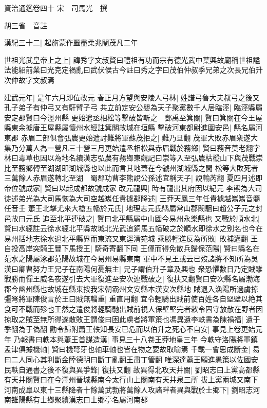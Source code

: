 資治通鑑卷四十
宋　司馬光　撰

胡三省　音註

漢紀三十二|{
	起旃蒙作噩盡柔兆閹茂凡二年}


世祖光武皇帝上之上|{
	諱秀字文叔賢曰禮祖有功而宗有德光武中葉興故廟稱世祖謚法能紹前業曰光克定禍亂曰武伏侯古今註曰秀之字曰茂伯仲叔季兄弟之次長兄伯升次仲故字文叔焉}


建武元年|{
	是年六月即位改元}
春正月方望與安陵人弓林|{
	姓譜弓魯大夫叔弓之後又孔子弟子有仲弓又有馯臂子弓}
共立前定安公嬰為天子聚黨數千人居臨涇|{
	臨涇縣屬安定郡賢曰今涇州縣}
更始遣丞相松等擊破皆斬之　鄧禹至箕關|{
	賢曰箕關在今王屋縣東余據唐王屋縣屬懷州水經註箕關故城在垣縣}
擊破河東都尉進圍安邑|{
	縣名屬河東郡}
赤眉二部俱會弘農更始遣討難將軍蘇茂拒之|{
	難乃旦翻}
茂軍大敗赤眉衆遂大集乃分萬人為一營凡三十營三月更始遣丞相松與赤眉戰於蓩鄉|{
	賢曰蓩音莫老翻字林曰毒草也因以為地名續漢志弘農有蓩鄉東觀記曰崇等入至弘農枯樅山下與茂戰崇比至蓩鄉轉至湖湖即湖城縣也以此而言其地蓋在今虢州湖城縣之間}
松等大敗死者三萬餘人赤眉遂轉北至湖　蜀郡功曹李熊說公孫述宜稱天子|{
	說輸芮翻}
夏四月述即帝位號成家|{
	賢曰以起成都故號成家}
改元龍興|{
	時有龍出其府因以紀元}
李熊為大司徒述弟光為大司馬恢為大司空越嶲任貴據郡降述|{
	王莽天鳳三年任貴據越嶲嶲音髓任音壬}
蕭王北擊尤來大槍五幡於元氏|{
	地理志元氏縣屬常山郡闞駰曰趙公子元之封邑故曰元氏}
追至北平連破之|{
	賢曰北平縣屬中山國今易州永樂縣也}
又戰於順水北|{
	賢曰水經註云徐水經北平縣故城北光武追銅馬五幡破之於順水即徐水之别名也今在易州括地志徐水過北平縣界而東流又東逕清苑城}
乘勝輕進反為所敗|{
	敗補邁翻}
王自投高岸突騎王豐下馬授王|{
	騎奇寄翻下同}
王僅而得免散兵歸保范陽|{
	賢曰縣名在范水之陽屬涿郡范陽故城在今易州易縣東南}
軍中不見王或云已歿諸將不知所為吳漢曰卿曹努力王兄子在南陽何憂無主|{
	兄子謂伯升子章及興也}
衆恐懼數日乃定賊雖戰勝而憚王威名夜遂引去大軍復進至安次連戰破之|{
	復扶又翻賢曰安次縣名屬渤海郡今幽州縣也故城在縣東按我宋朝霸州文安縣本漢安次縣地}
賊退入漁陽所過虜掠彊弩將軍陳俊言於王曰賊無輜重|{
	重直用翻}
宜令輕騎出賊前使百姓各自堅壁以絶其食可不戰而殄也王然之遣俊將輕騎馳出賊前視人保壁堅完者敕令固守放散在野者因掠取之賊至無所得遂散敗王謂俊曰困此虜者將軍策也馮異遺李軼書為陳禍福|{
	遺于季翻為于偽翻}
勸令歸附蕭王軼知長安已危而以伯升之死心不自安|{
	事見上卷更始元年}
乃報書曰軼本與蕭王首謀造漢|{
	事見三十八卷王莽地皇三年}
今軼守洛陽將軍鎮孟津俱據機軸|{
	賢曰機弩牙也軸車軸也皆在物之要故取喻焉}
千載一會思成斷金|{
	易曰二人同心其利斷金陸德明曰斷丁亂翻王肅丁管翻}
唯深達蕭王願進愚策以佐國安民軼自通書之後不復與異爭鋒|{
	復扶又翻}
故異得北攻天井關|{
	劉昭志曰上黨高都縣有天井關賢曰在今澤州晉城縣南今太行山上關南有天井泉三所}
拔上黨兩城又南下河南成臯以東十三縣降者十餘萬武勃將萬餘人攻諸畔者異與戰於士鄉下|{
	劉昭志河南雒陽縣有士鄉聚續漢志曰士鄉亭名屬河南郡}
